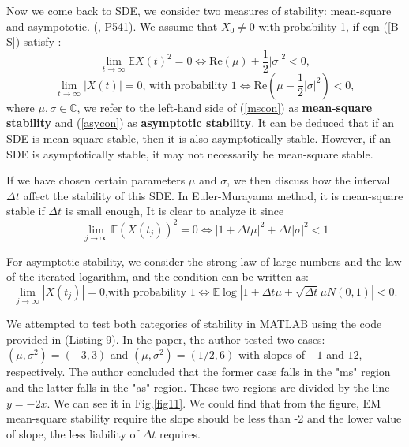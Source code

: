 \documentclass[12pt,a4paper]{article}
\newcommand{\C}{\mathbb{C}}
\theoremstyle{definition}
\begin{document}
Now we come back to SDE, we consider two measures of stability: mean-square and asympototic. (\cite{higham._2001}, P541). We assume that $X_0\ne 0$ with probability 1, if eqn (\ref{B-S}) satisfy :\begin{equation}
    \label{mscon} \lim_{t\to \infty} \mathbb{E}X(t)^2 = 0\Leftrightarrow \text{Re}(\mu)+\frac{1}{2}|\sigma|^2 <0,
\end{equation}
\begin{equation}
    \label{asycon} \lim_{t\to \infty}|X(t)| = 0\text{, with probability 1}\Leftrightarrow \text{Re}\left(\mu-\frac{1}{2}|\sigma|^2\right)<0,
\end{equation}
where $\mu,\sigma\in \C$, we refer to the left-hand side of (\ref{mscon}) as \textbf{mean-square stability} and (\ref{asycon}) as \textbf{asymptotic stability}. It can be deduced that if an SDE is mean-square stable, then it is also asymptotically stable. However, if an SDE is asymptotically stable, it may not necessarily be mean-square stable.

If we have chosen certain parameters $\mu$ and $\sigma$, we then discuss how the interval $\Delta t$ affect the stability of this SDE. In Euler-Murayama method, it is mean-square stable if $\Delta t$ is small enough, It is clear to analyze it since\begin{equation}
    \label{eq7.3} \lim_{j\to \infty}\mathbb{E}(X(t_j))^2=0\Leftrightarrow |1+\Delta t\mu|^2+\Delta t |\sigma|^2<1
\end{equation}

For asymptotic stability, we consider the strong law of large numbers and the law of the iterated logarithm, and the condition can be written as:\begin{equation}
\label{eq7.4} \lim_{j\to \infty} |X(t_j)|=0 \text{,with probability 1}\Leftrightarrow \mathbb{E}\log|1+\Delta t \mu +\sqrt{\Delta t}\mu N(0,1)|<0.
\end{equation}

We attempted to test both categories of stability in MATLAB using the code provided in \cite{higham._2001} (Listing 9). In the paper, the author tested two cases: $(\mu,\sigma^2)=(-3,3)$ and $(\mu,\sigma^2)=(1/2,6)$ with slopes of $-1$ and $12$, respectively. The author concluded that the former case falls in the "ms" region and the latter falls in the "as" region. These two regions are divided by the line $y=-2x$. We can see it in Fig.\ref{fig11}. We could find that from the figure, EM mean-square stability require the slope should be less than -2 and the lower value of slope, the less liability of $\Delta t$ requires.
\end{document}

